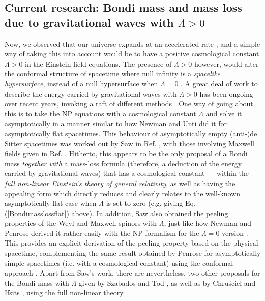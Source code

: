 \documentclass[aps,pre,preprint,superscriptaddress,showpacs,showkeys]{revtex4-1}
\begin{document}
\subsection{Current research: Bondi mass and mass loss due to gravitational waves with $\Lambda>0$}\label{Section1A}

Now, we observed that our universe expands at an accelerated rate \cite{cosmo1,cosmo2}, and a simple way of taking this into account would be to have a positive cosmological constant $\Lambda>0$ in the Einstein field equations. The presence of $\Lambda>0$ however, would alter the conformal structure of spacetime where null infinity is a \emph{spacelike hypersurface}, instead of a null hypersurface when $\Lambda=0$ \cite{Pen65}. A great deal of work to describe the energy carried by gravitational waves with $\Lambda>0$ has been ongoing over recent years, invoking a raft of different methods \cite{Vee2016,Vee2017,Vee2017b,Vee2017c,Szabados,Chrusciel,chi1,chi2,ash1,ash2,ash3,ash4,gracos1,gracos2,Zhang}. One way of going about this is to take the NP equations with a cosmological constant $\Lambda$ and solve it asymptotically in a manner similar to how Newman and Unti did it for asymptotically flat spacetimes. This behaviour of asymptotically empty (anti-)de Sitter spacetimes was worked out by Saw in Ref. \cite{Vee2016}, with those involving Maxwell fields given in Ref. \cite{Vee2017}. Hitherto, this appears to be the only proposal of a Bondi mass \emph{together with} a mass-loss formula (therefore, a deduction of the energy carried by gravitational waves) that has a cosmological constant --- within the \emph{full non-linear Einstein's theory of general relativity}, as well as having the appealing form which directly reduces and clearly relates to the well-known asymptotically flat case when $\Lambda$ is set to zero (e.g. giving Eq. (\ref{Bondimasslossflat}) above). In addition, Saw also obtained the peeling properties of the Weyl and Maxwell spinors with $\Lambda$, just like how Newman and Penrose derived it rather easily with the NP formalism for the $\Lambda=0$ version \cite{newpen62}. This provides an explicit derivation of the peeling property based on the physical spacetime, complementing the same result obtained by Penrose for asymptotically simple spacetimes (i.e. with a cosmological constant) using the conformal approach \cite{Pen65}. Apart from Saw's work, there are nevertheless, two other proposals for the Bondi mass with $\Lambda$ given by Szabados and Tod \cite{Szabados}, as well as by Chru\'{s}ciel and Ifsits \cite{Chrusciel}, using the full non-linear theory.
\end{document}
